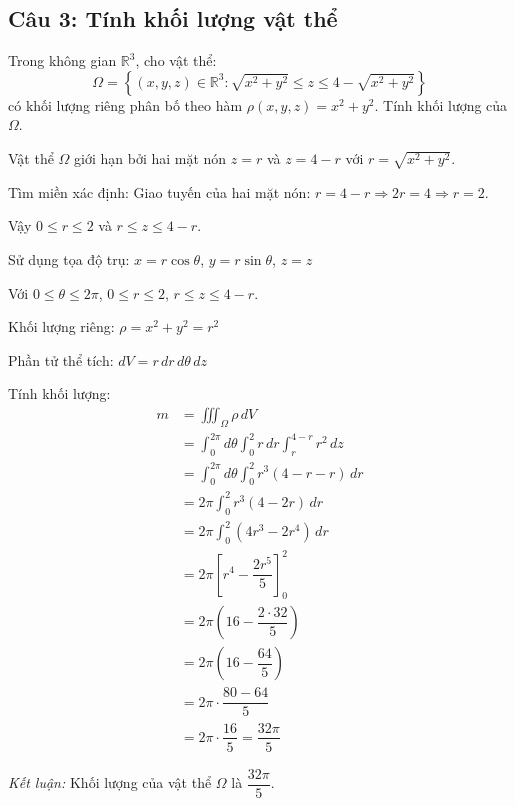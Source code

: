 \subsection*{Câu 3: Tính khối lượng vật thể}

\begin{questionbox}
Trong không gian $\mathbb{R}^3$, cho vật thể:
\[
    \Omega = \left\{ (x, y, z) \in \mathbb{R}^3 : \sqrt{x^2 + y^2} \leq z \leq 4 - \sqrt{x^2 + y^2} \right\}
\]
có khối lượng riêng phân bố theo hàm $\rho(x, y, z) = x^2 + y^2$. Tính khối lượng của $\Omega$.
\end{questionbox}

\begin{solution}
Vật thể $\Omega$ giới hạn bởi hai mặt nón $z = r$ và $z = 4 - r$ với $r = \sqrt{x^2+y^2}$.

\textit{} Tìm miền xác định:
Giao tuyến của hai mặt nón: $r = 4 - r \Rightarrow 2r = 4 \Rightarrow r = 2$.

Vậy $0 \leq r \leq 2$ và $r \leq z \leq 4-r$.

\textit{} Sử dụng tọa độ trụ:
$x = r\cos\theta$, $y = r\sin\theta$, $z = z$

Với $0 \leq \theta \leq 2\pi$, $0 \leq r \leq 2$, $r \leq z \leq 4-r$.

Khối lượng riêng: $\rho = x^2 + y^2 = r^2$

Phần tử thể tích: $dV = r \, dr \, d\theta \, dz$

\textit{} Tính khối lượng:
\begin{align*}
    m &= \iiint_\Omega \rho \, dV \\
    &= \int_0^{2\pi} d\theta \int_0^2 r \, dr \int_r^{4-r} r^2 \, dz \\
    &= \int_0^{2\pi} d\theta \int_0^2 r^3 (4-r-r) \, dr \\
    &= 2\pi \int_0^2 r^3 (4 - 2r) \, dr \\
    &= 2\pi \int_0^2 (4r^3 - 2r^4) \, dr \\
    &= 2\pi \left[ r^4 - \dfrac{2r^5}{5} \right]_0^2 \\
    &= 2\pi \left( 16 - \dfrac{2 \cdot 32}{5} \right) \\
    &= 2\pi \left( 16 - \dfrac{64}{5} \right) \\
    &= 2\pi \cdot \dfrac{80 - 64}{5} \\
    &= 2\pi \cdot \dfrac{16}{5} = \dfrac{32\pi}{5}
\end{align*}

\textit{Kết luận:} Khối lượng của vật thể $\Omega$ là $\dfrac{32\pi}{5}$.
\end{solution}

